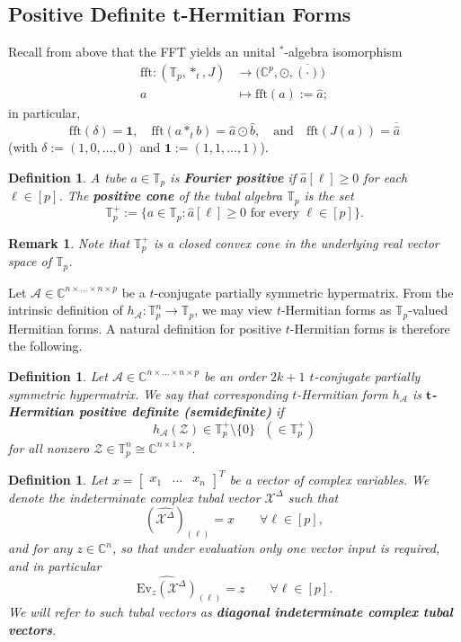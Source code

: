 \documentclass[11pt]{article}
\newtheorem{defn}[theorem]{Definition}
\newtheorem{remark}[theorem]{Remark}
\begin{document}
\subsection{Positive Definite t-Hermitian Forms}\label{Positive Definite t-Hermitian Forms}
Recall from above that the FFT yields an unital $^*$-algebra isomorphism 
\begin{align*}
    \mathrm{fft}:(\mathbb{T}_p,*_t,J)&\longrightarrow \big(\mathbb{C}^p,\odot,\overline{(\cdot)}\big) \\
    a&\mapsto \mathrm{fft}(a) := \widehat{a};
\end{align*}
in particular, 
\[\mathrm{fft}(\delta) = \mathbf{1},\quad \mathrm{fft}(a*_tb) = \widehat{a}\odot \widehat{b},\quad\text{and}\quad \mathrm{fft}(J(a)) = \overline{\widehat{a}}\]
(with $\delta := (1,0,\dots,0)$ and $\mathbf{1} := (1,1,\dots,1)$). 
\begin{defn}
    A tube $a\in \mathbb{T}_p$ is \textbf{Fourier positive} if $\widehat{a}[\ell]\geq 0$ for each $\ell\in [p]$. The \textbf{positive cone} of the tubal algebra $\mathbb{T}_p$ is the set 
    \[\mathbb{T}_p^+ := \{a\in \mathbb{T}_p:\widehat{a}[\ell]\geq 0\text{ for every }\ell\in [p]\}.\]
\end{defn}
\begin{remark}
    Note that $\mathbb{T}_p^+$ is a closed convex cone in the underlying real vector space of $\mathbb{T}_p$.
\end{remark} 
Let $\mathcal{A}\in \mathbb{C}^{n\times\dots\times n\times p}$ be a $t$-conjugate partially symmetric hypermatrix. From the intrinsic definition of $h_{\mathcal{A}}:\mathbb{T}_p^n\rightarrow \mathbb{T}_p$, we may view $t$-Hermitian forms as $\mathbb{T}_p$-valued Hermitian forms. A natural definition for positive $t$-Hermitian forms is therefore the following.
\begin{defn}
    Let $\mathcal{A}\in \mathbb{C}^{n\times\dots\times n\times p}$ be an order $2k+1$ $t$-conjugate partially symmetric hypermatrix. We say that corresponding $t$-Hermitian form $h_{\mathcal{A}}$ is \textbf{$\boldsymbol{t}$-Hermitian positive definite (semidefinite)} if 
    \[h_{\mathcal{A}}(\mathcal{Z})\in \mathbb{T}_p^+\setminus \{0\}\text{ }(\in \mathbb{T}_p^+)\]
    for all nonzero $\mathcal{Z}\in \mathbb{T}_p^n\cong \mathbb{C}^{n\times 1\times p}$. 
\end{defn}
\begin{defn}
    Let $x = \left[\begin{array}{ccc}
        x_1 & \dots & x_n
    \end{array}\right]^T$ be a vector of complex variables. We denote the indeterminate complex tubal vector $\mathcal{X}^{\Delta}$ such that 
    \[(\widehat{\mathcal{X}^{\Delta}})_{(\ell)} = x\qquad \forall \ell\in [p],\]
    and for any $z\in \mathbb{C}^n$, so that under evaluation only one vector input is required, and in particular
    \[\widehat{\mathrm{Ev}_z(\mathcal{X}^{\Delta})}_{(\ell)} = z\qquad \forall \ell\in [p].\]
    We will refer to such tubal vectors as \textbf{diagonal indeterminate complex tubal vectors}. 
\end{defn}
\end{document}
